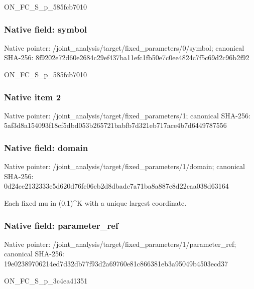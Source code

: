 \documentclass[10pt,a4paper]{article}
\begin{document}
\begingroup\raggedright\sloppy ON\_\allowbreak{}FC\_\allowbreak{}S\_\allowbreak{}p\_\allowbreak{}585fcb7010\par\endgroup

\subsubsection{Native field: symbol}
Native pointer: /joint\_\allowbreak{}analysis/target/fixed\_\allowbreak{}parameters/0/symbol; canonical SHA-256: 8f9202e72d60e2684c29ef437ba11efc1fb50e7c0ee4824c7f5c69d2c96b2f92

\begingroup\raggedright\sloppy ON\_\allowbreak{}FC\_\allowbreak{}S\_\allowbreak{}p\_\allowbreak{}585fcb7010\par\endgroup

\subsubsection{Native item 2}
Native pointer: /joint\_\allowbreak{}analysis/target/fixed\_\allowbreak{}parameters/1; canonical SHA-256: 5af3d8a154093f18cf5dbd053b265721babfb7d321eb717ace4b7d6449787556

\subsubsection{Native field: domain}
Native pointer: /joint\_\allowbreak{}analysis/target/fixed\_\allowbreak{}parameters/1/domain; canonical SHA-256: 0d24ce2132333e5d620d76fe06cb2d8dbadc7a71ba8a887e8d22caa038d63164

\begingroup\raggedright\sloppy Each fixed mu in (0,\allowbreak{}1)\textasciicircum{}K with a unique largest coordinate.\par\endgroup

\subsubsection{Native field: parameter\_\allowbreak{}ref}
Native pointer: /joint\_\allowbreak{}analysis/target/fixed\_\allowbreak{}parameters/1/parameter\_\allowbreak{}ref; canonical SHA-256: 19e02389706214ed7d32db77f93d2a69760e81c866381eb3a95049b4503ecd37

\begingroup\raggedright\sloppy ON\_\allowbreak{}FC\_\allowbreak{}S\_\allowbreak{}p\_\allowbreak{}3c4ea41351\par\endgroup
\end{document}
